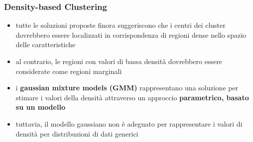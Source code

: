 \begin{frame}
\begin{columns}
		\end{columns}


\end{frame}


\begin{frame}

	\frametitle{{\color{GradientDescentDiagramRed}Density-based Clustering}}

		\begin{itemize}
			\item tutte le soluzioni proposte finora suggeriscono che i centri dei cluster dovrebbero essere localizzati in corrispondenza di regioni dense nello spazio delle caratteristiche
			\item al contrario, le regioni con valori di bassa densità dovrebbero essere considerate come regioni marginali
			\item i \textbf{gaussian mixture models (GMM)} rappresentano una soluzione per stimare i valori della densità attraverso un approccio  \textbf{parametrico, basato su un modello}
			\item tuttavia, il modello gaussiano non è adeguato per rappresentare i valori di densità per distribuzioni di dati generici
		\end{itemize}

\end{frame}


